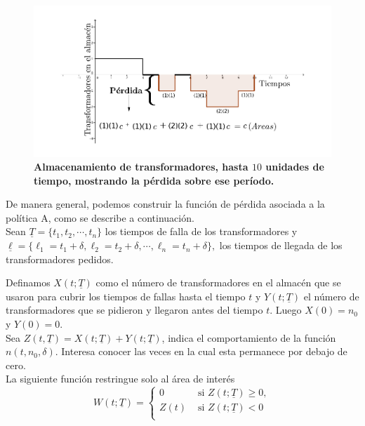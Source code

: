 \begin{figure}[h!]
\begin{center}
\includegraphics[scale=1]{tr1.pdf}
\end{center}
\vspace{-1.5 cm} \caption{\bf Almacenamiento de transformadores, hasta $10$ unidades de tiempo, mostrando la p\'erdida sobre ese per\'iodo.}\label{tr}
\end{figure}



\noindent De manera  general, podemos construir la funci\'on de p\'erdida asociada a la pol\'itica A, como se describe a continuaci\'on.\\[0.2cm]
\noindent Sean $\underline{T}=\{t_1,t_2,\cdots,t_n\}$ los tiempos de falla de los transformadores y 
$\underline{\ell}=\{\ell_1=t_1+\delta, \ell_2=t_2+\delta, \cdots, \ell_n=t_n+\delta\},$ los tiempos de llegada de los transformadores pedidos. 

\noindent  Definamos  $X(t;\underline{T})$ como el  n\'umero de transformadores en el almac\'en que se usaron para cubrir los tiempos de fallas hasta el tiempo $t$ y  $Y(t;\underline{T})$ el n\'umero de transformadores que se pidieron y llegaron antes del tiempo $t$. Luego $X(0)=n_0$ y $Y(0)=0$.\\[0.1cm]
\noindent Sea $Z(t,\underline{T})=X(t;\underline{T})+Y(t;\underline{T})$, indica el comportamiento de la funci\'on $n(t,n_0,\delta)$. Interesa conocer las veces en la cual esta permanece por debajo de cero.\\[0.1cm] 
\noindent La siguiente funci\'on restringue solo al \'area de inter\'es 
\[
W(t;\underline{T})=\left\{
\begin{array}{cl}
\displaystyle 0 & \mbox{ si } Z(t;\underline{T})\geq 0,\\                                                               Z(t)      &     \mbox{ si } Z(t;\underline{T})< 0  \\
\end{array}
\right.
\]


